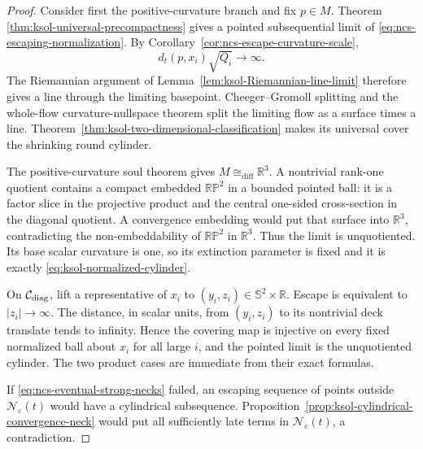\documentclass[10pt]{coll-l}
\newcommand{\R}{\mathbb{R}}
\newcommand{\Sph}{\mathbb{S}}
\newcommand{\diffeo}{\mathrel{\cong_{\mathrm{diff}}}}
\theoremstyle{definition}
\theoremstyle{remark}
\numberwithin{section}{chapter}
\numberwithin{equation}{chapter}
\begin{document}
\begin{proof}
Consider first the positive-curvature branch and fix $p\in M$.  Theorem
\ref{thm:ksol-universal-precompactness} gives a pointed subsequential limit
of \eqref{eq:ncs-escaping-normalization}.  By
Corollary~\ref{cor:ncs-escape-curvature-scale},
\begin{equation}
        d_t(p,x_i)\sqrt{Q_i}\longrightarrow\infty.      \label{eq:ncs-pole-escapes-normalized}
\end{equation}
The Riemannian argument of
Lemma~\ref{lem:ksol-Riemannian-line-limit} therefore gives a line through
the limiting basepoint.  Cheeger--Gromoll splitting and the whole-flow
curvature-nullspace theorem split the limiting flow as a surface times a
line.  Theorem~\ref{thm:ksol-two-dimensional-classification} makes its
universal cover the shrinking round cylinder.

The positive-curvature soul theorem gives $M\diffeo\R^3$.  A nontrivial
rank-one quotient contains a compact embedded $\mathbb{RP}^2$ in a bounded
pointed ball: it is a factor slice in the projective product and the central
one-sided cross-section in the diagonal quotient.  A convergence embedding
would put that surface into $\R^3$, contradicting the non-embeddability of
$\mathbb{RP}^2$ in $\R^3$.  Thus the limit is unquotiented.  Its base scalar
curvature is one, so its extinction parameter is fixed and it is exactly
\eqref{eq:ksol-normalized-cylinder}.

On $\mathcal C_{\rm diag}$, lift a representative of $x_i$ to
$(y_i,z_i)\in\Sph^2\times\R$.  Escape is equivalent to
$|z_i|\to\infty$.  The distance, in scalar units, from $(y_i,z_i)$ to its
nontrivial deck translate tends to infinity.  Hence the covering map is
injective on every fixed normalized ball about $x_i$ for all large $i$,
and the pointed limit is the unquotiented cylinder.  The two product cases
are immediate from their exact formulas.

If \eqref{eq:ncs-eventual-strong-necks} failed, an escaping sequence of
points outside $\mathscr N_\varepsilon(t)$ would have a cylindrical
subsequence.  Proposition~\ref{prop:ksol-cylindrical-convergence-neck}
would put all sufficiently late terms in
$\mathscr N_\varepsilon(t)$, a contradiction.
\end{proof}
\end{document}
